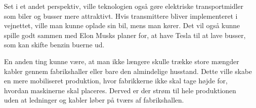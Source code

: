 Set i et andet perspektiv, ville teknologien også gøre elektriske transportmidler som biler og busser mere attraktivt. Hvis transmittere bliver implementeret i vejnettet, ville man kunne oplade sin bil, mens man kører. Det vil også kunne spille godt sammen med Elon Musks planer for, at have Tesla til at lave busser, som kan skifte benzin buerne ud.

En anden ting kunne være, at man ikke længere skulle trække store mængder kabler gennem fabrikshaller eller bare den almindelige husstand. Dette ville skabe en mere mobiliseret produktion, hvor fabrikkerne ikke skal tage højde for, hvordan maskinerne skal placeres. Derved er der strøm til hele produktionen uden at ledninger og kabler løber på tværs af fabrikshallen.

\newpage